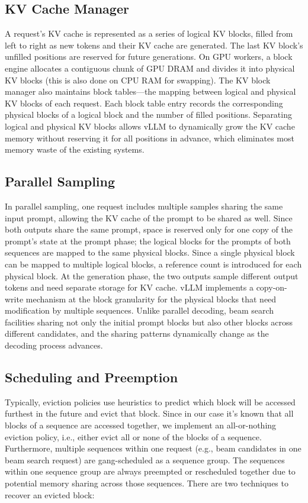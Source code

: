 \subsection{KV Cache Manager}
A request's KV cache is represented as a series of logical KV blocks, filled from left to right as new tokens and their KV cache are generated. The last KV block's unfilled positions are reserved for future generations. On GPU workers, a block engine allocates a contiguous chunk of GPU DRAM and divides it into physical KV blocks (this is also done on CPU RAM for swapping). The KV block manager also
maintains block tables—the mapping between logical and physical KV blocks of each request. Each block table entry records the corresponding physical blocks of a logical block and the number of filled positions. Separating logical and physical KV blocks allows vLLM to dynamically grow the KV cache memory without reserving it for all positions in advance, which eliminates most memory waste of the existing systems.

\subsection{Parallel Sampling}
In parallel sampling, one request includes multiple samples sharing the same input prompt, allowing the KV cache of the prompt to be shared as well. Since both outputs share the same prompt, space is reserved only for one copy of the prompt's state at the prompt phase; the logical blocks for the prompts of both sequences are mapped to the same physical blocks. Since a single physical block can be mapped to multiple logical blocks, a reference count is introduced for each physical block. At the generation phase, the two outputs sample different output tokens and need separate storage for KV cache. vLLM implements a copy-on-write mechanism at the block granularity for the physical blocks that need modification by multiple sequences. Unlike parallel decoding, beam search facilities sharing not only the initial prompt blocks but also other blocks across different candidates, and the sharing patterns dynamically change as the decoding process advances.


\subsection{Scheduling and Preemption}
Typically, eviction policies use heuristics to predict which block will be accessed furthest in the future and evict that block. Since in our case it's known that all blocks of a sequence are accessed together, we implement an all-or-nothing eviction policy, i.e., either evict all or none of the blocks of a sequence. Furthermore, multiple sequences within one request (e.g., beam candidates in one beam search request) are gang-scheduled as a sequence group. The sequences within one sequence group are always preempted or rescheduled together due to potential memory sharing across those sequences. There are two techniques to recover an evicted block:

